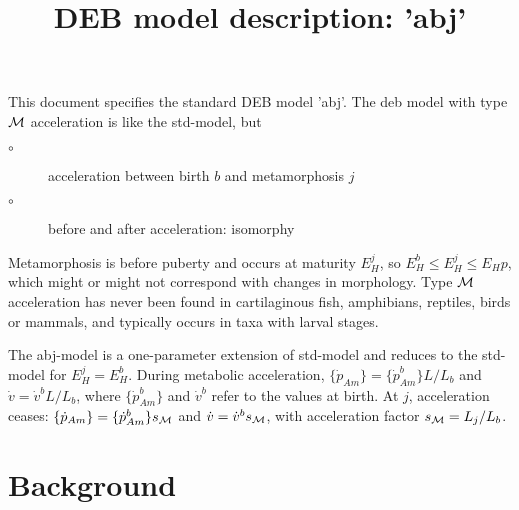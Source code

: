 \documentclass{article}
\title{DEB model description: 'abj'}
\begin{document}
\maketitle

This document specifies the standard DEB model 'abj'.
The {\sc deb} model with type $\cal M$ acceleration is like the std-model, but 
\begin{description}
  \item[$\circ$] acceleration between birth $b$ and metamorphosis $j$
	
  \item[$\circ$] before and after acceleration: isomorphy
\end{description}
Metamorphosis is before puberty and occurs at maturity $E_H^j$, so $E_H^b \le E_H^j \le E_Hp$, which might or might not correspond with changes in morphology.
Type $\cal M$ acceleration has never been found in cartilaginous fish, amphibians, reptiles, birds or mammals, 
  and typically occurs in taxa with larval stages.

The abj-model is a one-parameter extension of std-model and reduces to the std-model for $E_H^j = E_H^b$.
During metabolic acceleration, $\{\dot{p}_{Am}\} = \{\dot{p}_{Am}^b\} L/ L_b$ and $\dot{v} = \dot{v}^b L/ L_b$, 
  where $\{\dot{p}_{Am}^b\}$ and $\dot{v}^b$ refer to the values at birth.
At $j$, acceleration ceases: $\{\dot{p}_{Am}\} = \{\dot{p}_{Am}^b\} s_{\cal M}$ and $\dot{v} = \dot{v}^b s_{\cal M}$, 
  with acceleration factor $s_{\cal M} = L_j/ L_b$.
 

\section{Background}







\end{document}
